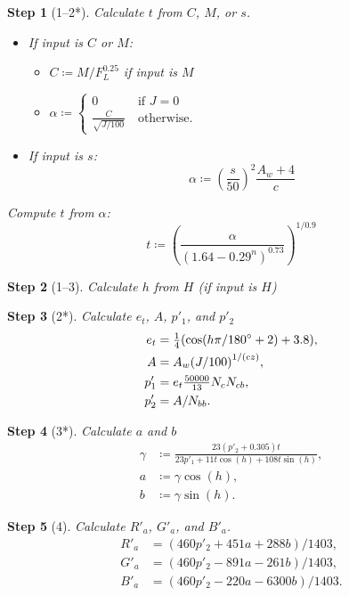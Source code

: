 \documentclass[twocolumn]{scrartcl}
\theoremstyle{named}
\newtheorem*{step}{Step}
\begin{document}
\begin{step}[1--2*]
Calculate $t$ from $C$, $M$, or $s$.
\begin{itemize}
  \item If input is $C$ or $M$:
    \begin{itemize}
      \item $C\coloneqq M / F_L^{0.25}$ if input is $M$
      \item $\alpha\coloneqq\begin{cases}
          0 &\:\text{if $J=0$}\\
          \frac{C}{\sqrt{J/100}}&\:\text{otherwise}.
      \end{cases}$
    \end{itemize}
  \item If input is $s$:
    \[
    \alpha \coloneqq {\left(\frac{s}{50}\right)}^2 \frac{A_w+4}{c}
    \]
\end{itemize}
Compute $t$ from $\alpha$:
\[
  t \coloneqq {\left(\frac{\alpha}{{(1.64 - 0.29^n)}^{0.73}}\right)}^{1/0.9}
\]
\end{step}

\begin{step}[1--3]
  Calculate $h$ from $H$ (if input is $H$)
\end{step}

\begin{step}[2*]
Calculate $e_t$, $A$, $p'_1$, and $p'_2$
\begin{align*}
  e_t &= \tfrac{1}{4} (\cos(h\pi/180\degree + 2) + 3.8),\\
  A &= A_w  {(J/100)}^{1/(cz)},\\
  p'_1 &= e_t \tfrac{50000}{13} N_c N_{cb},\\
  p'_2 &= A / N_{bb}.
\end{align*}
\end{step}

\begin{step}[3*]
Calculate $a$ and $b$
  \begin{align*}
    \gamma &\coloneqq \frac{23 (p'_2+0.305) t}{23 p'_1 + 11 t \cos(h) + 108 t \sin(h)},\\
    a &\coloneqq \gamma \cos(h),\\
    b &\coloneqq \gamma \sin(h).
  \end{align*}
\end{step}

\begin{step}[4]
  Calculate $R'_a$, $G'_a$, and $B'_a$.
  \begin{align*}
    R'_a &= (460 p'_2 + 451 a + 288 b) / 1403,\\
    G'_a &= (460 p'_2 - 891 a - 261 b) / 1403,\\
    B'_a &= (460 p'_2 - 220 a - 6300 b) / 1403.
  \end{align*}%
\end{step}
\end{document}

